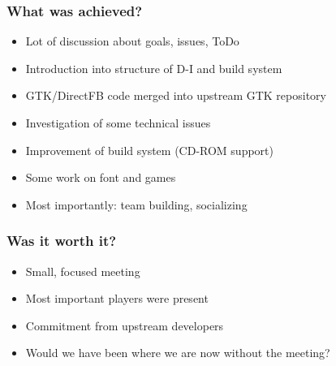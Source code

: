 \documentclass{beamer}
\begin{document}
\begin{frame}
  \frametitle{What was achieved?}
	\begin{itemize}
	\item
		Lot of discussion about goals, issues, ToDo
	\item
		Introduction into structure of D-I and build system
	\item
		GTK/DirectFB code merged into upstream GTK repository
	\item
		Investigation of some technical issues
	\item
		Improvement of build system (CD-ROM support)
	\item
		Some work on font and games
	\item
		Most importantly: team building, socializing
	\end{itemize}
\end{frame}

\begin{frame}
  \frametitle{Was it worth it?}
	\begin{itemize}
	\item
		Small, focused meeting
	\item
		Most important players were present
	\item
		Commitment from upstream developers
	\item
		Would we have been where we are now without the meeting?
	\end{itemize}
\end{frame}
\end{document}
